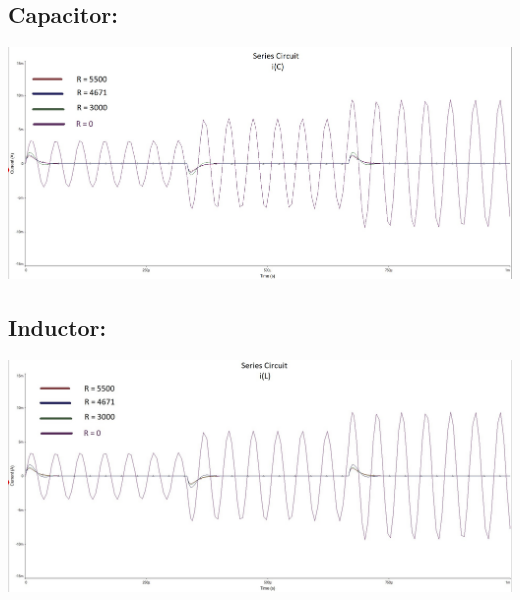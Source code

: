 \documentclass[a4paper,twoside]{report}
\newenvironment{Figure}
  {\par\medskip\minipage{\linewidth}}
  {\endminipage\par\medskip}
\begin{document}
        \begin{multicols}{2}\setlength{\columnseprule}{0pt}
            \subsection*{Capacitor:}
                \vfill\null
                \columnbreak
                \begin{center}
                    \begin{Figure}
                        \includegraphics[width=\linewidth]{part6-capacitor.jpg}
                    \end{Figure}
                \end{center}
        \end{multicols}

        \begin{multicols}{2}\setlength{\columnseprule}{0pt}
            \subsection*{Inductor:}
                \vfill\null
                \columnbreak
                \begin{center}
                    \begin{Figure}
                        \includegraphics[width=\linewidth]{part6-inductor.jpg}
                    \end{Figure}
                \end{center}
        \end{multicols}
\end{document}
